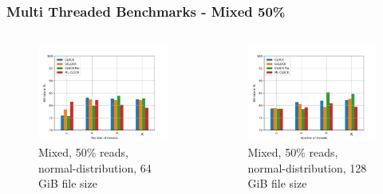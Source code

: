 \documentclass[
	aspectratio=169,
	compress,
]{beamer}
\newcommand{\navframetitle}[1]{\frametitle{#1\hfill{\footnotesize\lastsection{}}}}
\begin{document}
\begin{frame}[fragile]
	\navframetitle{Multi Threaded Benchmarks - Mixed 50\%}

	\begin{columns}
		\begin{column}{0.5\textwidth}
			\begin{figure}[ht]
    			\centering
    			\includegraphics[width=\textwidth]{multi_64_gb_rw_50to50_normal.jpg}
        		\caption{Mixed, 50\% reads, normal-distribution, 64 GiB file size}
			\end{figure}
		\end{column}
		\begin{column}{0.5\textwidth}
			\begin{figure}[ht]
    			\centering
    			\includegraphics[width=\textwidth]{multi_128_gb_rw_50to50_normal.jpg}
        		\caption{Mixed, 50\% reads, normal-distribution, 128 GiB file size}
			\end{figure}			
		\end{column}
	\end{columns}
\end{frame}
\end{document}
